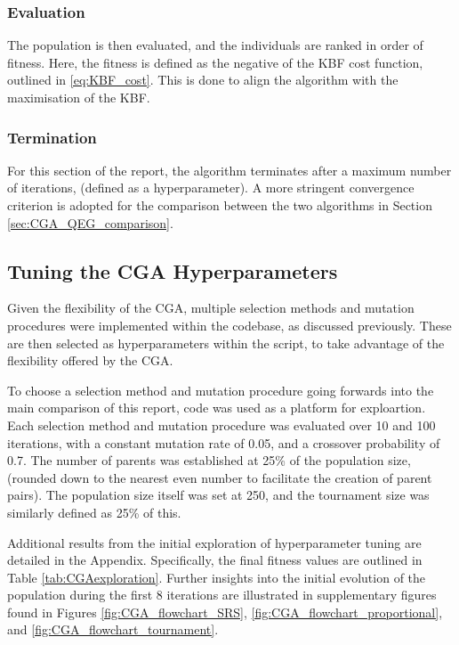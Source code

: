 \documentclass[10pt]{article}
\begin{document}
\begin{multicols}{2}
\subsubsection{Evaluation}

The population is then evaluated, and the individuals are ranked in order of fitness. Here, the fitness is defined as the negative of the KBF cost function, outlined in \ref{eq:KBF_cost}. This is done to align the algorithm with the maximisation of the KBF.

\subsubsection{Termination}

For this section of the report, the algorithm terminates after a maximum number of iterations, (defined as a hyperparameter). A more stringent convergence criterion is adopted for the comparison between the two algorithms in Section \ref{sec:CGA_QEG_comparison}.

\subsection{Tuning the CGA Hyperparameters}
\label{sec:CGA_selection_mutation}

Given the flexibility of the CGA, multiple selection methods and mutation procedures were implemented within the codebase, as discussed previously. These are then selected as hyperparameters within the script, %
to take advantage of the flexibility offered by the CGA. 

To choose a selection method and mutation procedure going forwards into the main comparison of this report, code %
was used as a platform for exploartion. Each selection method and mutation procedure was evaluated over 10 and 100 iterations, with a constant mutation rate of 0.05, and a crossover probability of 0.7. The number of parents was established at 25\% of the population size, (rounded down to the nearest even number to facilitate the creation of parent pairs). The population size itself was set at 250, and the tournament size was similarly defined as 25\% of this.

Additional results from the initial exploration of hyperparameter tuning are detailed in the Appendix. Specifically, the final fitness values are outlined in Table \ref{tab:CGAexploration}. Further insights into the initial evolution of the population during the first 8 iterations are illustrated in supplementary figures found in Figures \ref{fig:CGA_flowchart_SRS}, \ref{fig:CGA_flowchart_proportional}, and \ref{fig:CGA_flowchart_tournament}.


\end{multicols}
\end{document}
